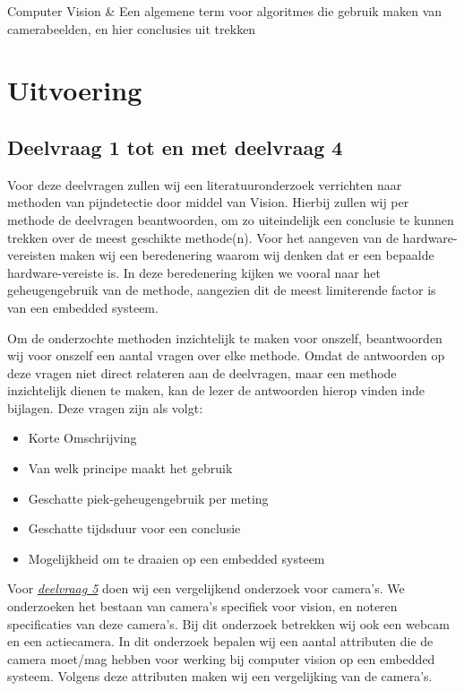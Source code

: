 \documentclass[11pt]{article}
\begin{document}
    \begin{definition}
        Computer Vision & Een algemene term voor algoritmes die gebruik maken van camerabeelden, en hier conclusies uit trekken\\

    \end{definition}


    \section{Uitvoering}\label{sec:uitvoering}

    \subsection{Deelvraag 1 tot en met deelvraag 4}\label{subsec:deelvraag-1-tot-en-met-deelvraag-4}
    Voor deze deelvragen zullen wij een literatuuronderzoek
    verrichten naar methoden van pijndetectie door middel van Vision.
    Hierbij zullen wij per methode de deelvragen beantwoorden, om zo uiteindelijk een conclusie te kunnen trekken over
    de meest geschikte methode(n).
    Voor het aangeven van de hardware-vereisten maken wij een beredenering waarom wij denken dat er een bepaalde hardware-vereiste is.
    In deze beredenering kijken we vooral naar het geheugengebruik van de methode,
    aangezien dit de meest limiterende factor is van een embedded systeem.

    Om de onderzochte methoden inzichtelijk te maken voor onszelf, beantwoorden wij voor onszelf een aantal vragen over elke methode.
    Omdat de antwoorden op deze vragen niet direct relateren aan de deelvragen, maar een methode inzichtelijk dienen te maken, kan de lezer de antwoorden hierop vinden inde bijlagen.
    Deze vragen zijn als volgt:
    \begin{itemize}
        \item Korte Omschrijving
        \item Van welk principe maakt het gebruik
        \item Geschatte piek-geheugengebruik per meting
        \item Geschatte tijdsduur voor een conclusie
        \item Mogelijkheid om te draaien op een embedded systeem
    \end{itemize}


    Voor \emph{\hyperref[itm:dv1]{deelvraag 5}} doen wij een vergelijkend onderzoek voor camera's.
    We onderzoeken het bestaan van camera's specifiek voor vision, en noteren specificaties van deze camera's.
    Bij dit onderzoek betrekken wij ook een webcam en een actiecamera.
    In dit onderzoek bepalen wij een aantal attributen die de camera moet/mag hebben voor werking bij computer vision op een embedded systeem.
    Volgens deze attributen maken wij een vergelijking van de camera's.
\end{document}
